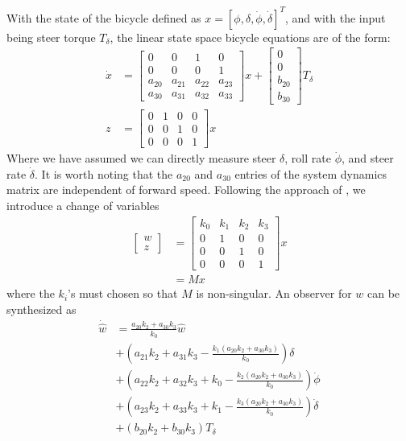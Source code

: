 \documentclass[letterpaper,11pt]{article}
\begin{document}
With the state of the bicycle defined as $x = \left[\phi, \delta, \dot{\phi},
\dot{\delta}\right]^T$, and with the input being steer torque $T_\delta$, the
linear state space bicycle equations are of the form:
\begin{align*}
\dot{x} &=\left[\begin{smallmatrix}0 & 0 & 1 & 0\\0 & 0 & 0 & 1\\a_{20} & a_{21} &
a_{22} & a_{23}\\a_{30} & a_{31} & a_{32} & a_{33}\end{smallmatrix}\right] x +
\left[\begin{smallmatrix}0\\0\\b_{20}\\b_{30}\end{smallmatrix}\right] T_\delta
\\
z &= \left[\begin{smallmatrix}0 & 1 & 0 & 0\\ 0 & 0 & 1 & 0\\ 0 & 0 & 0 &
1\end{smallmatrix}\right] x
\end{align*}
Where we have assumed we can directly measure steer $\delta$, roll rate $\dot{\phi}$, and
steer rate $\dot{\delta}$.  It is worth noting that the $a_{20}$ and $a_{30}$ entries of
the system dynamics matrix are independent of forward speed.  Following the
approach of \citet*{Bryson1970}, we introduce a change of variables
\begin{align*}
\left[\begin{smallmatrix}w \\ z\end{smallmatrix}\right] &=
\left[\begin{smallmatrix}k_0 & k_1 & k_2 & k_3 \\ 0 & 1 & 0 & 0\\ 0 & 0 & 1 & 0\\ 0 & 0 & 0 &
1\end{smallmatrix}\right] x \\
 &= M x
\end{align*}
where the $k_i$'s must chosen so that $M$ is non-singular.  An observer
for $w$ can be synthesized as
\begin{align*}
\dot{\hat{w}} &= \frac{a_{20} k_{2} + a_{30} k_{3}}{k_{0}} \hat{w} \\
 &+ \left(a_{21} k_{2} + a_{31} k_{3} - \frac{k_{1} \left(a_{20} k_{2} + a_{30} k_{3}\right)}{k_{0}}\right) \delta \\
 &+ \left(a_{22} k_{2} + a_{32} k_{3} + k_{0} - \frac{k_{2} \left(a_{20} k_{2} + a_{30} k_{3}\right)}{k_{0}}\right) \dot{\phi} \\
 &+ \left(a_{23} k_{2} + a_{33} k_{3} + k_{1} - \frac{k_{3} \left(a_{20} k_{2} + a_{30} k_{3}\right)}{k_{0}}\right) \dot{\delta} \\
 &+ \left(b_{20} k_{2} + b_{30} k_{3}\right) T_\delta
\end{align*}
\end{document}

